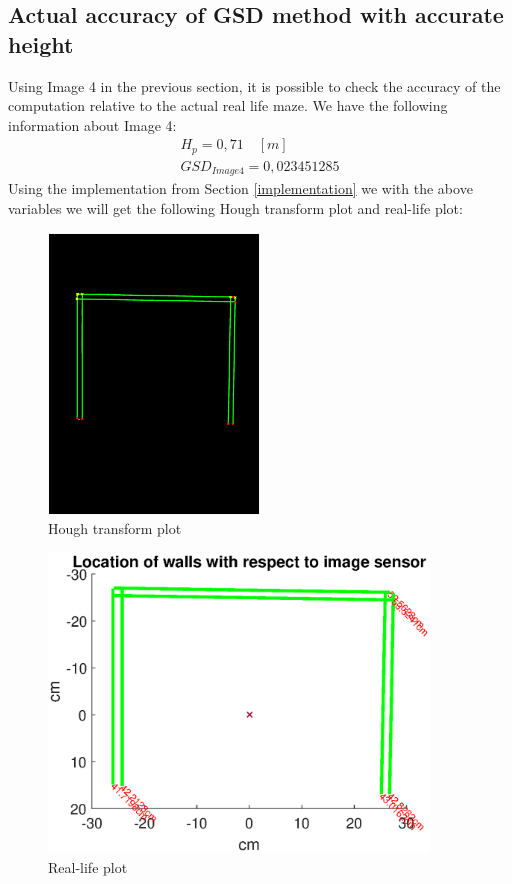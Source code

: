 \subsection{Actual accuracy of GSD method with accurate height}
\label{actualgsd}
Using Image 4 in the previous section, it is possible to check the accuracy of the computation relative to the actual real life maze. We have the following information about Image 4:
\begin{align*}
H_p = 0,71 \quad [m]\\
GSD_{Image 4} = 0,023451285
\end{align*}
Using the implementation from Section \ref{implementation} we with the above variables we will get the following Hough transform plot and real-life plot:
\begin{figure}[H]
\centering
\includegraphics[width=0.5\textwidth]{fig/GSDmethod}
  \caption{Hough transform plot}
  \label{fig:GSDmethod1}
\end{figure}
\begin{figure}[H]
\centering
\includegraphics[width=0.9\textwidth]{fig/GSDmethod2}
  \caption{Real-life plot}
  \label{fig:GSDmethod2}
\end{figure}

